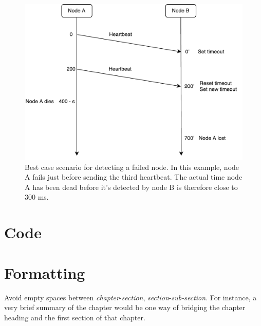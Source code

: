 \documentclass{cslthse-msc}
\begin{document}
\begin{appendices}
\begin{figure}[!hbt]
\centering
\includegraphics[scale=0.5]{images/heartbeats_best_case.pdf}
\caption{Best case scenario for detecting a failed node. In this example, node A fails just before sending the third heartbeat. The actual time node A has been dead before it's detected by node B is therefore close to 300 ms.} \label{fig:heartbeats_worst_case}
\end{figure}

\chapter{Code} \label{appendix:code}

\end{appendices}









\iffalse


\chapter[Short on Formatting]{Formatting}
Avoid empty spaces between \textit{chapter}-\textit{section}, \textit{section}-\textit{sub-section}. For instance, a very brief summary of the chapter would be one way of bridging the chapter heading and the first section of that chapter.
\end{document}
